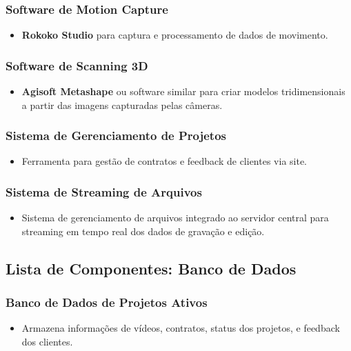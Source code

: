 \subsubsection{Software de Motion Capture}
\begin{itemize}
    \item \textbf{Rokoko Studio} para captura e processamento de dados de movimento.
\end{itemize}

\subsubsection{Software de Scanning 3D}
\begin{itemize}
    \item \textbf{Agisoft Metashape} ou software similar para criar modelos tridimensionais a partir das imagens capturadas pelas câmeras.
\end{itemize}

\subsubsection{Sistema de Gerenciamento de Projetos}
\begin{itemize}
    \item Ferramenta para gestão de contratos e feedback de clientes via site.
\end{itemize}

\subsubsection{Sistema de Streaming de Arquivos}
\begin{itemize}
    \item Sistema de gerenciamento de arquivos integrado ao servidor central para streaming em tempo real dos dados de gravação e edição.
\end{itemize}

\subsection{Lista de Componentes: Banco de Dados}

\subsubsection{Banco de Dados de Projetos Ativos}
\begin{itemize}
    \item Armazena informações de vídeos, contratos, status dos projetos, e feedback dos clientes.
\end{itemize}

